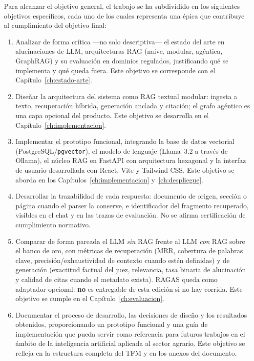 Para alcanzar el objetivo general, el trabajo se ha subdividido en los siguientes objetivos específicos, cada uno de los cuales representa una épica que contribuye al cumplimiento del objetivo final:

\begin{enumerate}[label=\textbf{OE\arabic*.}, leftmargin=*, itemsep=0.55em]
  \item Analizar de forma crítica ---no solo descriptiva--- el estado del arte en alucinaciones de LLM, arquitecturas RAG (naive, modular, agéntica, GraphRAG) y su evaluación en dominios regulados, justificando qué se implementa y qué queda fuera.
        Este objetivo se corresponde con el Capítulo~\ref{ch:estado-arte}.

  \item Diseñar la arquitectura del sistema como RAG textual modular: ingesta a texto, recuperación híbrida, generación anclada y citación; el grafo agéntico es una capa opcional del producto.
        Este objetivo se desarrolla en el Capítulo~\ref{ch:implementacion}.

  \item Implementar el prototipo funcional, integrando la base de datos vectorial (PostgreSQL/\texttt{pgvector}), el modelo de lenguaje (Llama~3.2 a través de Ollama), el núcleo RAG en FastAPI con arquitectura hexagonal y la interfaz de usuario desarrollada con React, Vite y Tailwind CSS.
        Este objetivo se aborda en los Capítulos~\ref{ch:implementacion} y~\ref{ch:despliegue}.

  \item Desarrollar la trazabilidad de cada respuesta: documento de origen, sección o página cuando el parser la conserve, e identificador del fragmento recuperado, visibles en el chat y en las trazas de evaluación. No se afirma certificación de cumplimiento normativo.

  \item Comparar de forma pareada el LLM \emph{sin} RAG frente al LLM \emph{con} RAG sobre el banco de oro, con métricas de recuperación (MRR, cobertura de palabras clave, precisión/exhaustividad de contexto cuando estén definidas) y de generación (exactitud factual del juez, relevancia, tasa binaria de alucinación y calidad de citas cuando el metadato exista). RAGAS queda como adaptador opcional: \textbf{no} es entregable de esta edición si no hay corrida.
        Este objetivo se cumple en el Capítulo~\ref{ch:evaluacion}.

  \item Documentar el proceso de desarrollo, las decisiones de diseño y los resultados obtenidos, proporcionando un prototipo funcional y una guía de implementación que pueda servir como referencia para futuros trabajos en el ámbito de la inteligencia artificial aplicada al sector agrario.
        Este objetivo se refleja en la estructura completa del TFM y en los anexos del documento.
\end{enumerate}

